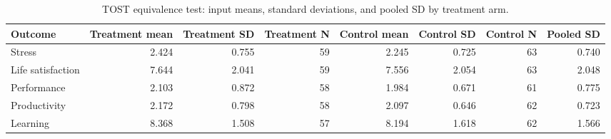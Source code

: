 \begin{table}

\caption{\label{tab:TOST-input}TOST equivalence test: input means, standard deviations, and pooled SD by treatment arm.}
\centering
\begin{tabular}[t]{lrrrrrrr}
\toprule
Outcome & Treatment mean & Treatment SD & Treatment N & Control mean & Control SD & Control N & Pooled SD\\
\midrule
Stress & 2.424 & 0.755 & 59 & 2.245 & 0.725 & 63 & 0.740\\
Life satisfaction & 7.644 & 2.041 & 59 & 7.556 & 2.054 & 63 & 2.048\\
Performance & 2.103 & 0.872 & 58 & 1.984 & 0.671 & 61 & 0.775\\
Productivity & 2.172 & 0.798 & 58 & 2.097 & 0.646 & 62 & 0.723\\
Learning & 8.368 & 1.508 & 57 & 8.194 & 1.618 & 62 & 1.566\\
\bottomrule
\end{tabular}
\end{table}
